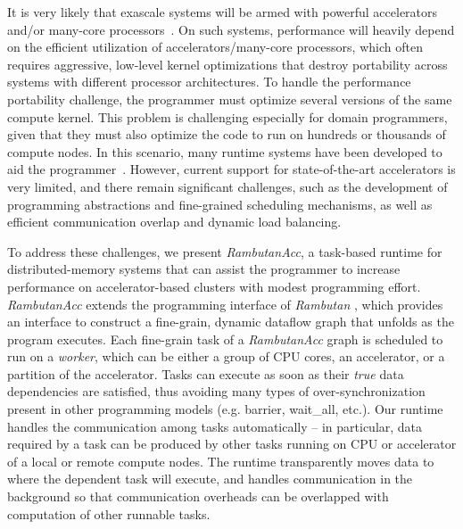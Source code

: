 It is very likely that exascale systems will be armed with powerful accelerators and/or  many-core processors~\cite{ASCR/Exascale/Lethin,  exascaleRoadMap}.
On such systems, performance will heavily depend on the efficient utilization of accelerators/many-core processors, which often requires aggressive, low-level kernel optimizations that destroy portability across systems with different processor architectures.
To handle the performance portability challenge, the programmer must optimize several versions of the same compute kernel.
This problem is challenging especially for domain programmers, given that they must also optimize the code to run on hundreds or thousands of compute nodes.
In this scenario, many runtime systems have been developed to aid the programmer~\cite{legion,physics,mpiacc,mvapich2gpu}.
However, current support for state-of-the-art accelerators is very limited, and there remain significant challenges, such as the development of programming abstractions and fine-grained scheduling mechanisms, as well as efficient communication overlap and dynamic load balancing.  

To address these challenges, we present {\em RambutanAcc}, a task-based runtime for distributed-memory systems that can assist the programmer to increase performance on accelerator-based clusters with modest programming effort.
{\em RambutanAcc} extends the programming interface of {\em Rambutan} \cite{rambutanWebsite}, which provides an interface to construct a fine-grain, dynamic dataflow graph that unfolds as the program executes. 
Each fine-grain task of a {\em RambutanAcc} graph is scheduled to run on a {\em worker}, which can be either a group of CPU cores, an accelerator, or a partition of the accelerator.
Tasks can execute as soon as their {\em true} data dependencies are satisfied, thus avoiding many types of over-synchronization present in other programming models (e.g. barrier, wait\_all, etc.).
Our runtime handles the communication among tasks automatically -- in particular, data required by a task can be produced by other tasks running on CPU or accelerator of a local or remote compute nodes.
The runtime transparently moves data to where the dependent task will execute, and
handles communication in the background so that communication overheads can be overlapped with computation of other runnable tasks.

